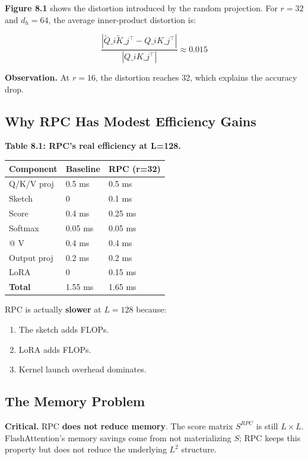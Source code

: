 \textbf{Figure 8.1} shows the distortion introduced by the random projection. 
For $r = 32$ and $d_h = 64$, the average inner-product distortion is:

\[
\frac{|\tilde{Q}\_i \tilde{K}\_j^\top - Q\_i K\_j^\top|}{|Q\_i K\_j^\top|} \approx 0.015
\]

\textbf{Observation.} At $r = 16$, the distortion reaches 32, 
which explains the accuracy drop.

\subsection{Why RPC Has Modest Efficiency Gains}

\textbf{Table 8.1: RPC's real efficiency at L=128.}

\begin{table}[H]
\centering
\small
\begin{tabular}{lll}
\toprule
\textbf{Component} & \textbf{Baseline} & \textbf{RPC (r=32)} \\
\midrule
Q/K/V proj & 0.5 ms & 0.5 ms \\
Sketch & 0 & 0.1 ms \\
Score & 0.4 ms & 0.25 ms \\
Softmax & 0.05 ms & 0.05 ms \\
@ V & 0.4 ms & 0.4 ms \\
Output proj & 0.2 ms & 0.2 ms \\
LoRA & 0 & 0.15 ms \\
\textbf{Total} & 1.55 ms & 1.65 ms \\
\bottomrule
\end{tabular}
\end{table}

RPC is actually \textbf{slower} at $L = 128$ because:
\begin{enumerate}
\item The sketch adds FLOPs.
\item LoRA adds FLOPs.
\item Kernel launch overhead dominates.

\end{enumerate}
\subsection{The Memory Problem}

\textbf{Critical.} RPC \textbf{does not reduce memory}. The score matrix 
$S^{RPC}$ is still $L \times L$. FlashAttention's memory savings come from 
not materializing $S$; RPC keeps this property but does not reduce the 
underlying $L^2$ structure.


